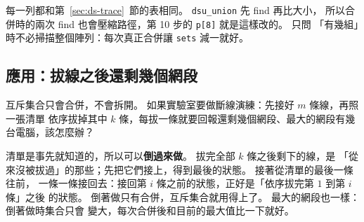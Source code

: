 
每一列都和第~\ref{sec:ds-trace}~節的表相同。 \texttt{dsu\_union} 先 find 再比大小，
所以合併時的兩次 find 也會壓縮路徑，第 10 步的 \texttt{p[8]} 就是這樣改的。 只問
「有幾組」時不必掃描整個陣列：每次真正合併讓 \texttt{sets} 減一就好。

\subsection{應用：拔線之後還剩幾個網段}
\label{sec:ds-app}

互斥集合只會合併，不會拆開。 如果實驗室要做斷線演練：先接好 $m$ 條線，再照一張清單
依序拔掉其中 $k$ 條，每拔一條就要回報還剩幾個網段、最大的網段有幾台電腦，該怎麼辦？

清單是事先就知道的，所以可以\textbf{倒過來做}。 拔完全部 $k$ 條之後剩下的線，是
「從來沒被拔過」的那些；先把它們接上，得到最後的狀態。 接著從清單的最後一條往前，
一條一條接回去：接回第 $i$ 條之前的狀態，正好是「依序拔完第 $1$ 到第 $i$ 條」之後
的狀態。 倒著做只有合併，互斥集合就用得上了。 最大的網段也一樣：倒著做時集合只會
變大，每次合併後和目前的最大值比一下就好。

